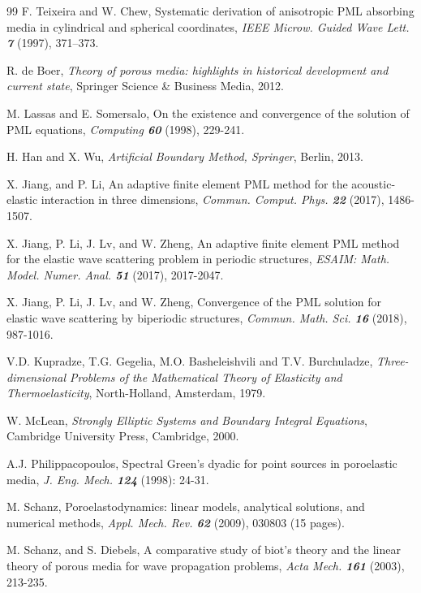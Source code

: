 \documentclass[11pt]{article}
\begin{document}
\begin{thebibliography}{99}
 F. Teixeira and W. Chew, Systematic derivation of anisotropic PML absorbing media in
cylindrical and spherical coordinates, {\em IEEE Microw. Guided Wave Lett. \bf 7} (1997), 371–373.

 R. de Boer, {\em Theory of porous media: highlights in historical development and 
current state}, Springer Science \& Business Media, 2012.


 M. Lassas and E. Somersalo, On the existence and convergence of the solution of PML 
equations, {\em Computing \bf 60} (1998), 229-241.

 H. Han and X. Wu, {\em Artificial Boundary Method, Springer}, Berlin, 2013.

 X. Jiang, and P. Li, An adaptive finite element PML method for the acoustic-elastic 
interaction in three dimensions, {\em Commun. Comput. Phys. \bf 22} (2017), 1486-1507.

 X. Jiang, P. Li, J. Lv, and W. Zheng, An adaptive finite element PML method for 
the elastic wave scattering problem in periodic structures, {\em ESAIM: Math. Model. Numer. Anal.
 \bf 51} (2017), 2017-2047.

 X. Jiang, P. Li, J. Lv, and W. Zheng, Convergence of the PML solution for elastic 
wave scattering by biperiodic structures, {\em Commun. Math. Sci. \bf 16} (2018), 987-1016.

 V.D. Kupradze, T.G. Gegelia, M.O. Basheleishvili and T.V. Burchuladze,
{\em Three-dimensional Problems of the Mathematical Theory of Elasticity and Thermoelasticity}, 
North-Holland, Amsterdam, 1979.

 W. McLean, {\em Strongly Elliptic Systems and Boundary Integral Equations}, 
Cambridge University Press, Cambridge, 2000.

A.J. Philippacopoulos, Spectral Green's dyadic for point sources in poroelastic media, 
{\em J. Eng. Mech. \bf124} (1998): 24-31.

 M. Schanz, Poroelastodynamics: linear models, analytical solutions, 
and numerical methods, {\em Appl. Mech. Rev. \bf 62} (2009), 030803 (15 pages).

 M. Schanz, and S. Diebels, A comparative study of biot's theory and the
 linear theory of porous media for wave propagation problems, {\em Acta Mech. \bf 161} (2003), 213-235.


\end{thebibliography}
\end{document}
